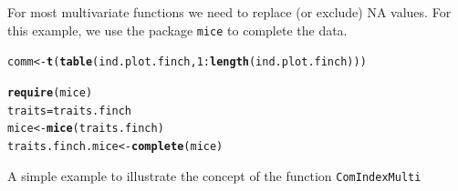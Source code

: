 \documentclass[12pt]{article}\usepackage[]{graphicx}\usepackage[]{color}
\makeatletter
\newcommand{\hlnum}[1]{\textcolor[rgb]{0.686,0.059,0.569}{#1}}%
\newcommand{\hlopt}[1]{\textcolor[rgb]{0,0,0}{#1}}%
\newcommand{\hlstd}[1]{\textcolor[rgb]{0.345,0.345,0.345}{#1}}%
\newcommand{\hlkwb}[1]{\textcolor[rgb]{0.69,0.353,0.396}{#1}}%
\newcommand{\hlkwd}[1]{\textcolor[rgb]{0.737,0.353,0.396}{\textbf{#1}}}%
\newenvironment{kframe}{%
 \def\at@end@of@kframe{}%
 \ifinner\ifhmode%
  \def\at@end@of@kframe{\end{minipage}}%
  \begin{minipage}{\columnwidth}%
 \fi\fi%
 \def\FrameCommand##1{\hskip\@totalleftmargin \hskip-\fboxsep
 \colorbox{shadecolor}{##1}\hskip-\fboxsep
     \hskip-\linewidth \hskip-\@totalleftmargin \hskip\columnwidth}%
 \MakeFramed {\advance\hsize-\width
   \@totalleftmargin\z@ \linewidth\hsize
   \@setminipage}}%
 {\par\unskip\endMakeFramed%
 \at@end@of@kframe}
\newenvironment{knitrout}{}{} %
\makeatother
\begin{document}
For most multivariate functions we need to replace (or exclude) NA values. For this example, we use the package \texttt{mice} to complete the data.

\begin{knitrout}
\color{fgcolor}\begin{kframe}
\begin{alltt}
\hlstd{comm}\hlkwb{<-}\hlkwd{t}\hlstd{(}\hlkwd{table}\hlstd{(ind.plot.finch,}\hlnum{1}\hlopt{:}\hlkwd{length}\hlstd{(ind.plot.finch)))}

\hlkwd{require}\hlstd{(mice)}
\hlstd{traits} \hlkwb{=} \hlstd{traits.finch}
\hlstd{mice}\hlkwb{<-}\hlkwd{mice}\hlstd{(traits.finch)}
\hlstd{traits.finch.mice}\hlkwb{<-}\hlkwd{complete}\hlstd{(mice)}
\end{alltt}
\end{kframe}
\end{knitrout}

A simple example to illustrate the concept of the function \texttt{ComIndexMulti}
\end{document}
